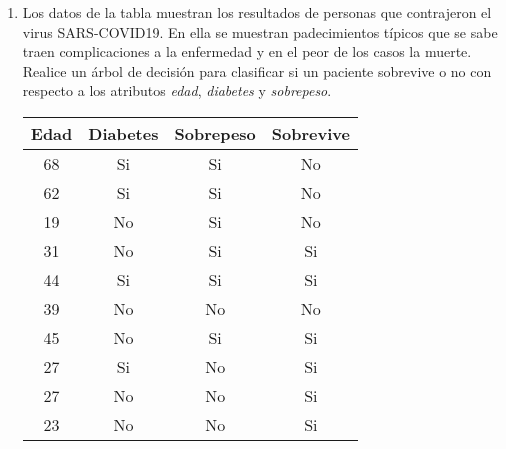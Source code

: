 \documentclass[
10pt, %
a4paper, %
]{article}
\begin{document}
\begin{enumerate}
    \item Los datos de la tabla muestran los resultados de personas que contrajeron el virus SARS-COVID19. En ella se muestran 
	padecimientos típicos que se sabe traen complicaciones a la enfermedad y en el peor de los casos la muerte. 
	Realice un árbol de decisión para clasificar si un paciente sobrevive o no con respecto a los 
	atributos \textit{edad}, \textit{diabetes} y \textit{sobrepeso}. 
        \begin{table}[H]
            \centering 
            \begin{tabular}{cccc}
                \toprule
                Edad & Diabetes & Sobrepeso & Sobrevive \\ \midrule
                68 & Si & Si & No \\
                62 & Si & Si & No \\
                19 & No & Si & No \\
                31 & No & Si & Si \\
                44 & Si & Si & Si \\
                39 & No & No & No \\
                45 & No & Si & Si \\
                27 & Si & No & Si \\
                27 & No & No & Si \\
                23 & No & No & Si \\
                \bottomrule
            \end{tabular}
        \end{table}


\end{enumerate}
\end{document}

